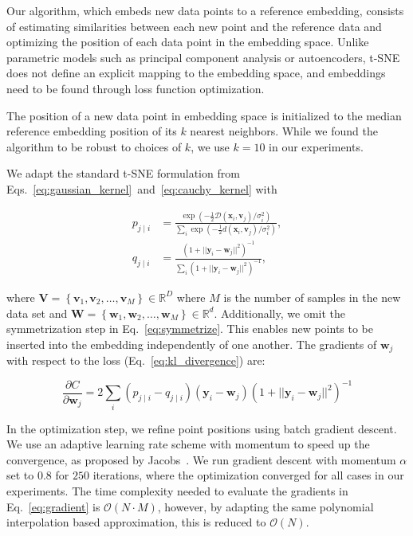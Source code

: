 \documentclass[runningheads]{llncs}
\begin{document}
Our algorithm, which embeds new data points to a reference embedding, consists of
estimating similarities between each new point and the reference data and optimizing
the position of each data point in the embedding space. Unlike parametric models
such as principal component analysis or autoencoders, t-SNE does not define an
explicit mapping to the embedding space, and embeddings need to be found through
loss function optimization.

The position of a new data
point in embedding space is initialized 
to the median reference embedding position of its $k$ nearest 
neighbors. While we found the algorithm to be
robust to choices of $k$, we use $k=10$ in our experiments.

We adapt the standard t-SNE formulation from
Eqs.~\ref{eq:gaussian_kernel}~and~\ref{eq:cauchy_kernel} with

\begin{align}
p_{j \mid i} &= \frac{\exp \left ( -\frac{1}{2} \mathcal{D}(\mathbf{x}_i, \mathbf{v}_j) / \sigma_i^2 \right )}{\sum_{i} \exp \left ( -\frac{1}{2} d(\mathbf{x}_i, \mathbf{v}_j) / \sigma_i^2 \right )}, \\
q_{j \mid i} &= \frac{\left ( 1 + || \mathbf{y}_i - \mathbf{w}_j ||^2 \right )^{-1}}{\sum_{i}\left ( 1 + || \mathbf{y}_i - \mathbf{w}_j ||^2 \right )^{-1}},
\end{align}

\noindent where $\mathbf{V} = \left \{ \mathbf{v}_1, \mathbf{v}_2, \dots,
\mathbf{v}_M \right \} \in \mathbb{R}^D$ where $M$ is the number of samples in
the new data set and $\mathbf{W} = \left \{ \mathbf{w}_1, \mathbf{w}_2, \dots,
\mathbf{w}_M \right \} \in \mathbb{R}^d$. Additionally, we omit the
symmetrization step in Eq.~\ref{eq:symmetrize}. This enables new points to be
inserted into the embedding independently of one another. The gradients of
$\mathbf{w}_j$ with respect to the loss (Eq.~\ref{eq:kl_divergence}) are:

\begin{equation}
\frac{\partial C}{\partial \mathbf{w}_j} = 2 \sum_i \left ( p_{j \mid i} - q_{j \mid i} \right ) \left ( \mathbf{y}_i - \mathbf{w}_j \right ) \left ( 1 + || \mathbf{y}_i - \mathbf{w}_j || ^2 \right )^{-1}
\label{eq:gradient}
\end{equation}

In the optimization step, we refine point positions using batch gradient
descent. We use an adaptive learning rate scheme with momentum 
to speed up the convergence, as proposed by Jacobs~\cite{momentum}. We run gradient descent
with momentum $\alpha$ set to $0.8$ for $250$ iterations, where the
optimization converged for all cases in our experiments.  The time complexity
needed to evaluate the gradients in Eq.~\ref{eq:gradient} is $\mathcal{O}(N
\cdot M)$, however, by adapting the same polynomial interpolation based
approximation, this is reduced to $\mathcal{O}(N)$.
\end{document}
